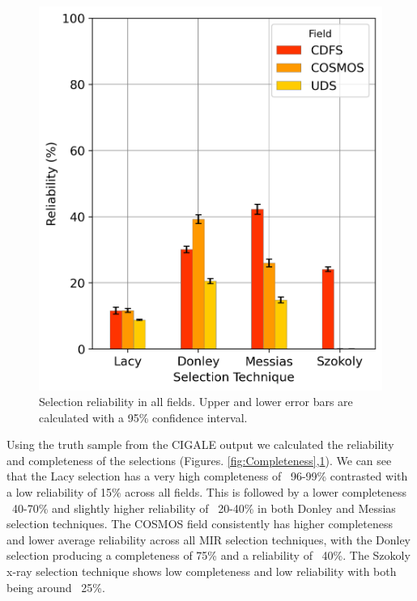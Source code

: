 \documentclass[11pt]{iopart}
\begin{document}
\begin{figure}
  \centering
  \includegraphics[width=0.90\linewidth]{plots/TechniqueReliability.png}
  \caption{Selection reliability in all fields. Upper and lower error bars are calculated with a 95\% confidence interval.}
  \label{fig:Reliability}
\end{figure}
\newpage
Using the truth sample from the CIGALE output we calculated the reliability and completeness of the selections (Figures. \ref{fig:Completeness},\ref{fig:Reliability}). We can see that the Lacy selection has a very high completeness of ~96-99\% contrasted with a low reliability of 15\% across all fields. This is followed by a lower completeness ~40-70\% and slightly higher reliability of ~20-40\% in both Donley and Messias selection techniques. The COSMOS field consistently has higher completeness and lower average reliability across all MIR selection techniques, with the Donley selection producing a completeness of 75\% and a reliability of ~40\%. The Szokoly x-ray selection technique shows low completeness and low reliability with both being around ~25\%. 
\end{document}

